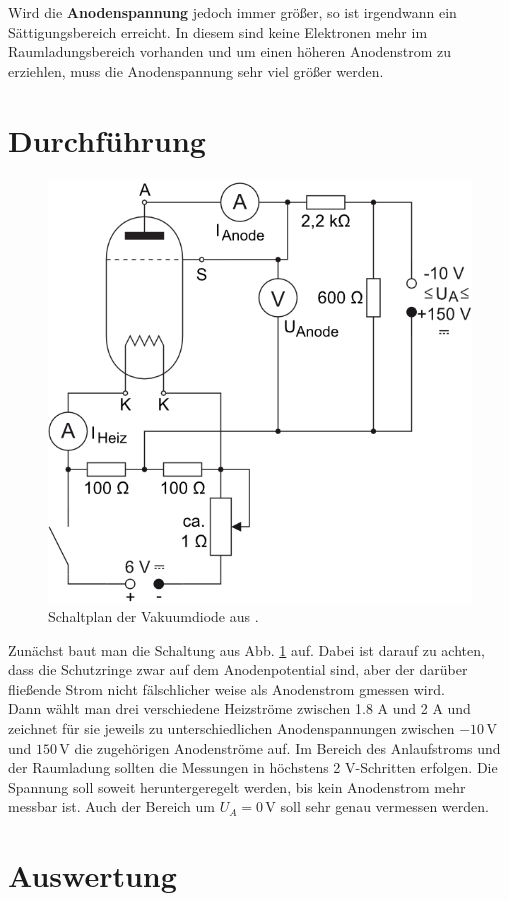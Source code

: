 \documentclass[12pt,a4paper,titlepage,headinclude,bibtotoc]{scrartcl}
\begin{document}
Wird die \textbf{Anodenspannung} jedoch immer größer, so ist irgendwann ein Sättigungsbereich erreicht.
In diesem sind keine Elektronen mehr im Raumladungsbereich vorhanden und um einen höheren Anodenstrom zu erziehlen, muss die Anodenspannung sehr viel größer werden.



\section{Durchführung}
\label{sec:durchfuehrung}
\begin{figure}[!h]
\centering
\includegraphics[width=0.5\linewidth]{aufbau}
\caption{Schaltplan der Vakuumdiode aus \cite[8.10.14, 12 Uhr]{LP17}.}
\label{fig:aufbau}
\end{figure}
Zunächst baut man die Schaltung aus Abb. \ref{fig:aufbau} auf.
Dabei ist darauf zu achten, dass die Schutzringe zwar auf dem Anodenpotential sind, aber der darüber fließende Strom nicht fälschlicher weise als Anodenstrom gmessen wird.\\
Dann wählt man drei verschiedene Heizströme zwischen 1.8 A und 2 A und zeichnet für sie jeweils zu unterschiedlichen Anodenspannungen zwischen $-10\,$V und $150\,$V die zugehörigen Anodenströme auf.
Im Bereich des Anlaufstroms und der Raumladung sollten die Messungen in höchstens 2 V-Schritten erfolgen.
Die Spannung soll soweit heruntergeregelt werden, bis kein Anodenstrom mehr messbar ist.
Auch der Bereich um $U_A=0\,$V soll sehr genau vermessen werden.

\section{Auswertung}
\label{sec:auswertung}
\end{document}

